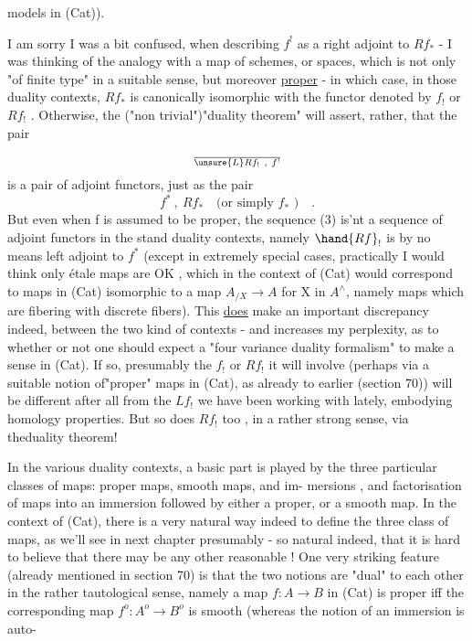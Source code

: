 
models in (Cat)).

I am sorry I was a bit confused, when describing $f^!$ as a right
adjoint to $Rf_*$ - I was thinking of the analogy with a map of schemes,
or spaces, which is not only "of finite type" in a suitable sense,
but moreover \uline{proper} - in which case, in those duality contexts,
$Rf_*$ is canonically isomorphic with the functor denoted by $f_!$ or $Rf_!$ .
Otherwise, the ("non trivial")"duality theorem" will assert, rather,
that  the pair
\[ \over{\unsure{L}}{R}f_! \ , \ f^! \]
is a pair of adjoint functors, just as  the pair
\[ f^* \ , \ Rf_* \quad \text{(or simply } f_* \text{ )} \quad . \]
But even when f is assumed to be proper, the sequence (3) is'nt a
sequence of adjoint functors in the stand duality contexts, namely
$\hand{Rf}_!$ is by no means left adjoint to $f^*$  (except in extremely special cases,
 practically I would think only étale maps are OK , which in
the context of (Cat) would correspond to  maps in
(Cat) isomorphic to a map $A_{/X} \longrightarrow A$ for X in $A^{\wedge}$, namely  maps
which are fibering with discrete fibers). This \uline{does} make an important
discrepancy indeed, between the two kind of contexts - and increases
my perplexity, as to whether or not one should expect a "four variance
duality formalism" to make a sense in (Cat). If so, presumably the
$f_!$ or $Rf_!$ it will involve (perhaps via a suitable notion of"proper"
maps in (Cat), as already  to earlier (section 70)) will be
different after all from the $Lf_!$ we have been working with lately,
embodying homology properties. \xout{(}But so does $Rf_!$ too , in a rather
strong sense,\xout{(} via theduality theorem!\xout{)}

In the various duality contexts, a basic part is played by the
three particular classes of maps: proper maps, smooth maps, and im-%
mersions , and factorisation of maps into an immersion followed by
either a proper, or a smooth map. In the context of (Cat), there
is a very natural way indeed to define the three class of maps, as
we'll see in next chapter presumably - so natural indeed, that it is
hard to believe that there may be any other reasonable ! One very
striking feature (already mentioned in section 70) is that the two 
notions are "dual" to each other in the rather tautological sense,
namely  a map $f: A \longrightarrow B$ in (Cat) is proper iff the corresponding map
$f^o : A^o \longrightarrow B^o$ is smooth (whereas the notion of an immersion is auto-%

